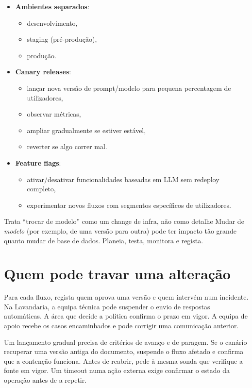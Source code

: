 \begin{itemize}[leftmargin=*]
\item \textbf{Ambientes separados}:
\begin{itemize}[leftmargin=*]
\item desenvolvimento,
\item staging (pré-produção),
\item produção.
\end{itemize}
\item \textbf{Canary releases}:
\begin{itemize}[leftmargin=*]
\item lançar nova versão de prompt/modelo para pequena percentagem de utilizadores,
\item observar métricas,
\item ampliar gradualmente se estiver estável,
\item reverter se algo correr mal.
\end{itemize}
\item \textbf{Feature flags}:
\begin{itemize}[leftmargin=*]
\item ativar/desativar funcionalidades baseadas em LLM sem redeploy completo,
\item experimentar novos fluxos com segmentos específicos de utilizadores.
\end{itemize}
\end{itemize}

\begin{keyideabox}{Trata “trocar de modelo” como um change de infra, não como detalhe}
Mudar de \emph{modelo} (por exemplo, de uma versão para outra) pode ter impacto tão grande quanto mudar de base de dados.
Planeia, testa, monitora e regista.
\end{keyideabox}

\section{Quem pode travar uma alteração}
Para cada fluxo, regista quem aprova uma versão e quem intervém num incidente. Na Lavandaria, a equipa técnica pode suspender o envio de respostas automáticas. A área que decide a política confirma o prazo em vigor. A equipa de apoio recebe os casos encaminhados e pode corrigir uma comunicação anterior.

Um lançamento gradual precisa de critérios de avanço e de paragem. Se o canário recuperar uma versão antiga do documento, suspende o fluxo afetado e confirma que a contenção funciona. Antes de reabrir, pede à mesma sonda que verifique a fonte em vigor. Um timeout numa ação externa exige confirmar o estado da operação antes de a repetir.

